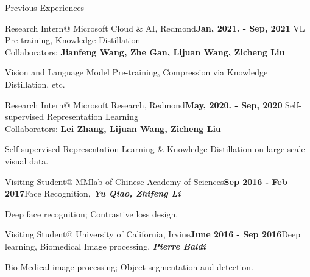 \documentclass{resume} %
\begin{document}
\begin{rSection}{Previous Experiences}


\begin{rSubsection}{Research Intern@ Microsoft Cloud \& AI, Redmond}\hfill{\textbf{Jan, 2021. - Sep, 2021}}{ VL Pre-training, Knowledge Distillation \\Collaborators: \hfill\textbf{Jianfeng Wang, Zhe Gan,  Lijuan Wang, Zicheng Liu}}
\item{Vision and Language Model Pre-training, Compression via Knowledge Distillation, etc. }
\end{rSubsection}

\begin{rSubsection}{Research Intern@ Microsoft Research, Redmond}\hfill{\textbf{May, 2020. - Sep, 2020}}{ Self-supervised Representation Learning \\Collaborators: \hfill \textbf{Lei Zhang, Lijuan Wang, Zicheng Liu}}
\item{Self-supervised Representation Learning \& Knowledge Distillation on large scale visual data.}
\end{rSubsection}

\begin{rSubsection}{Visiting Student@ MMlab of Chinese Academy of Sciences}\hfill{\textbf{Sep 2016 - Feb 2017}}{Face Recognition, \textbf{\textit{Yu Qiao, Zhifeng Li}}}{}
\item Deep face recognition; Contrastive loss design.
\end{rSubsection}

\begin{rSubsection}{Visiting Student@ University of California, Irvine}\hfill{\textbf{June 2016 - Sep 2016}}{Deep learning, Biomedical Image processing,  \textbf{\textit{Pierre Baldi}}}{}
\item Bio-Medical image processing; Object segmentation and detection.
\end{rSubsection} 

\end{rSection}
\end{document}

